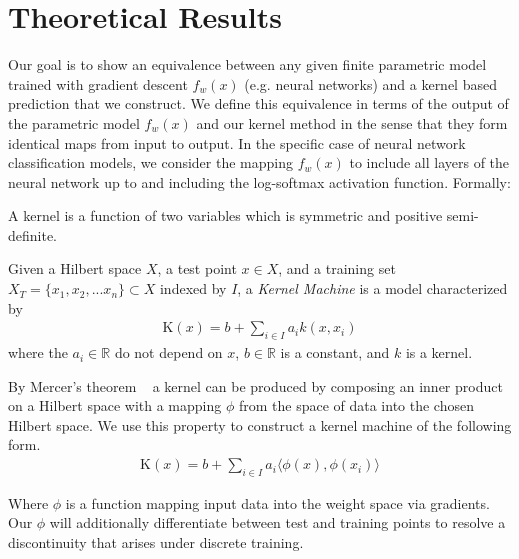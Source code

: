 
\section{Theoretical Results}

Our goal is to show an equivalence between any given finite parametric model trained with gradient descent $f_w(x)$  (e.g. neural networks) and a kernel based prediction that we construct. We define this equivalence in terms of the output of the parametric model $f_w(x)$ and our kernel method in the sense that they form identical maps from input to output. In the specific case of neural network classification models, we consider the mapping $f_w(x)$ to include all layers of the neural network up to and including the log-softmax activation function. Formally:
\begin{definition}
A {kernel} is a function of two variables which is symmetric and positive semi-definite. 
\end{definition}

\begin{definition}
Given a Hilbert space $X$, a test point $x \in X$, and a training set $X_T = \{x_1,x_2,...x_n\} \subset X$ indexed by $I$, a \emph{Kernel Machine} is a model characterized by 
\begin{align}
    \text{K}(x) = b + \sum_{i\in I} a_i k(x,x_i)
\end{align}
where the $a_i \in \mathbb{R}$ do not depend on $x$, $b \in \mathbb{R}$ is a constant, and $k$ is a kernel. ~\cite{rasmussen2006gaussian}

By Mercer's theorem ~\cite{ghojogh2021} a kernel can be produced by composing an inner product on a Hilbert space with a mapping $\phi$ from the space of data into the chosen Hilbert space.
We use this property to construct a kernel machine of the following form.
\begin{align}
    \text{K}(x) = b + \sum_{i\in I} a_i \langle \phi(x), \phi(x_i) \rangle
\end{align}
\end{definition}
Where $\phi$ is a function mapping input data into the weight space via gradients. Our $\phi$ will additionally differentiate between test and training points to resolve a discontinuity that arises under discrete training. 

